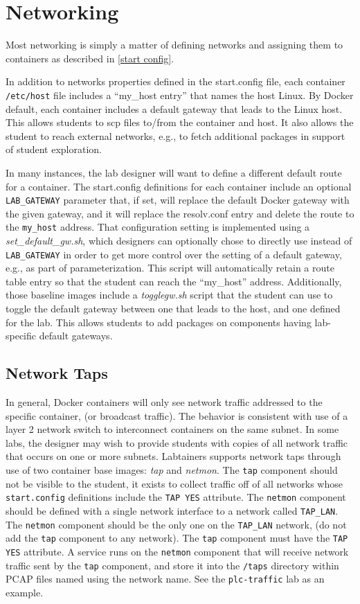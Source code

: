 \documentclass[12pt]{article}
\begin{document}
\section{Networking} \label{networking}
Most networking is simply a matter of defining networks and assigning them to containers
as described in \ref{start config}.  

In addition to networks properties defined in the
start.config file, each container \texttt{/etc/host} file includes a ``my\_host entry'' that names
the host Linux.  By Docker default, each container includes a default gateway that
leads to the Linux host.  This allows students to scp files to/from the container and host.
It also allows the student to reach external networks, e.g., to fetch additional packages in
support of student exploration.

In many instances, the lab designer will want to define a different default route for a 
container.  The start.config definitions for each container include an optional {\tt LAB\_GATEWAY} parameter
that, if set, will replace the default Docker gateway with the given gateway, and it will replace the
resolv.conf entry and delete the route to the {\tt my\_host} address. 
That configuration setting is implemented using a \textit{set\_default\_gw.sh}, which designers can 
optionally chose to directly use instead of {\tt LAB\_GATEWAY}
in order to get more control over the setting of a default gateway, e.g., as part of parameterization.
This script will automatically retain a route table entry so that the student can reach the ``my\_host''
address.  Additionally, those baseline images include a \textit{togglegw.sh} script that the student
can use to toggle the default gateway between one that leads to the host, and one defined for the lab.
This allows students to add packages on components having lab-specific default gateways.

\subsection{Network Taps}
In general, Docker containers will only see network traffic addressed to the specific container, (or 
broadcast traffic).  The behavior is consistent with use of a layer 2 network switch to interconnect
containers on the same subnet.  In some labs, the designer may wish to provide students with copies of
all network traffic that occurs on one or more subnets.  Labtainers supports network taps through use of
two container base images: \textit{tap} and \textit{netmon}.  The {\tt tap} component should not be visible
to the student, it exists to collect traffic off of all networks whose {\tt start.config} definitions include
the {\tt TAP YES} attribute.  The {\tt netmon} component should be defined with a single network interface
to a network called {\tt TAP\_LAN}.  The {\tt netmon} component should be the only one on the {\tt TAP\_LAN}
network, (do not add the {\tt tap} component to any network).  The {\tt tap} component must have the {\tt TAP YES}
attribute.  A service runs on the {\tt netmon} component
that will receive network traffic sent by the {\tt tap} component, and store it into the {\tt /taps} directory
within PCAP files named using the network name.  See the {\tt plc-traffic} lab as an example.
\end{document}
